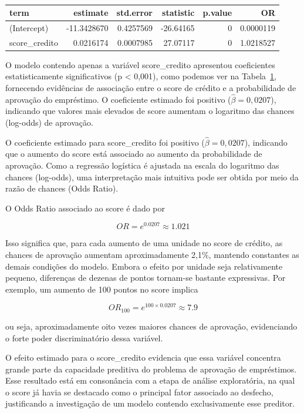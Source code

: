 \documentclass[
  brazilian,
  12pt,
  letterpaper,
  DIV=11,
  numbers=noendperiod]{scrartcl}
\begin{document}
{

\begin{longtable}[]{@{}lrrrrr@{}}

\caption{\label{tbl-complete-model-default-2}}

\tabularnewline

\toprule\noalign{}
term & estimate & std.error & statistic & p.value & OR \\
\midrule\noalign{}
\endhead
\bottomrule\noalign{}
\endlastfoot
(Intercept) & -11.3428670 & 0.4257569 & -26.64165 & 0 & 0.0000119 \\
score\_credito & 0.0216174 & 0.0007985 & 27.07117 & 0 & 1.0218527 \\

\end{longtable}

}

O modelo contendo apenas a variável score\_credito apresentou
coeficientes estatisticamente significativos (p \textless{} 0,001), como
podemos ver na Tabela~\ref{tbl-complete-model-default-2}, fornecendo
evidências de associação entre o score de crédito e a probabilidade de
aprovação do empréstimo. O coeficiente estimado foi positivo
(\(\hat{\beta}=0,0207\)), indicando que valores mais elevados de score
aumentam o logaritmo das chances (log-odds) de aprovação.

O coeficiente estimado para score\_credito foi positivo
(\(\hat{\beta}=0,0207\)), indicando que o aumento do score está
associado ao aumento da probabilidade de aprovação. Como a regressão
logística é ajustada na escala do logaritmo das chances (log-odds), uma
interpretação mais intuitiva pode ser obtida por meio da razão de
chances (Odds Ratio).

O Odds Ratio associado ao score é dado por

\[
OR = e^{0.0207} \approx 1.021
\]

Isso significa que, para cada aumento de uma unidade no score de
crédito, as chances de aprovação aumentam aproximadamente 2,1\%,
mantendo constantes as demais condições do modelo. Embora o efeito por
unidade seja relativamente pequeno, diferenças de dezenas de pontos
tornam-se bastante expressivas. Por exemplo, um aumento de 100 pontos no
score implica

\[
OR_{100}=e^{100\times0.0207}\approx7.9
\]

ou seja, aproximadamente oito vezes maiores chances de aprovação,
evidenciando o forte poder discriminatório dessa variável.

O efeito estimado para o score\_credito evidencia que essa variável
concentra grande parte da capacidade preditiva do problema de aprovação
de empréstimos. Esse resultado está em consonância com a etapa de
análise exploratória, na qual o score já havia se destacado como o
principal fator associado ao desfecho, justificando a investigação de um
modelo contendo exclusivamente esse preditor.
\end{document}

